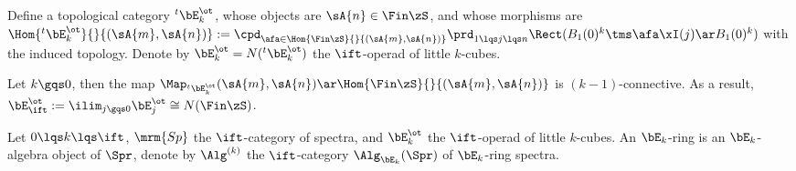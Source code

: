 \documentclass[article, a4paper, twoside]{universal}
\begin{document}
\begin{dfn}[5.1.0.2, 5.1.0.4]
    Define a topological category ${}^{t}\bE_{k}^{\ot}$, whose objects are $\sA{n}\in\Fin\zS$, and whose morphisms are $\Hom{{}^{t}\bE_{k}^{\ot}}{}{(\sA{m},\sA{n})}:=\cpd_{\afa\in\Hom{\Fin\zS}{}{(\sA{m},\sA{n})}}\prd_{1\lqs j\lqs n}\Rect(B_{1}(0)^{k}\tms\afa\xI(j)\ar B_{1}(0)^{k})$ with the induced topology. Denote by $\bE_{k}^{\ot}=N({}^{t}\bE_{k}^{\ot})$ the $\ift$-operad of little $k$-cubes.
\end{dfn}

\begin{thm}[5.1.1.4]
    Let $k\gqs0$, then the map $\Map_{{}^{t}\bE_{k}^{\ot}}(\sA{m},\sA{n})\ar\Hom{\Fin\zS}{}{(\sA{m},\sA{n})}$ is $(k-1)$-connective. As a result, $\bE_{\ift}^{\ot}:=\ilim_{j\gqs0}\bE_{j}^{\ot}\cong N(\Fin\zS)$.
\end{thm}




\begin{dfn}[7.1.0.1]
    Let $0\lqs k\lqs \ift$, $\mrm{Sp}$ the $\ift$-category of spectra, and $\bE_{k}^{\ot}$ the $\ift$-operad of little $k$-cubes. An $\bE_{k}$-ring is an $\bE_{k}$-algebra object of $\Spr$, denote by $\Alg^{(k)}$ the $\ift$-category $\Alg_{\bE_{k}}(\Spr)$ of $\bE_{k}$-ring spectra.
\end{dfn}



\printref
\end{document}
